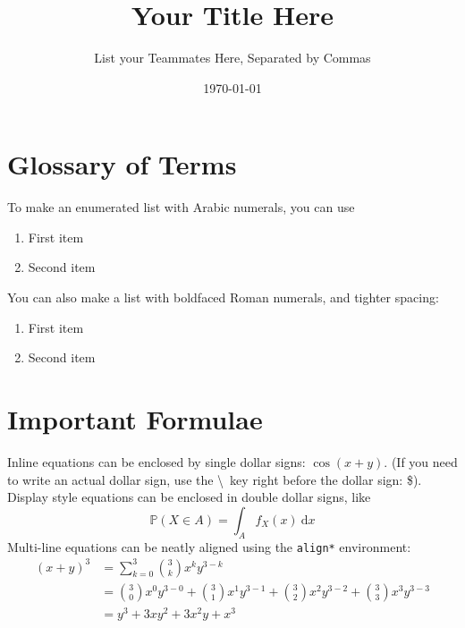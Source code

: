 \documentclass[11pt]{article}
\title{Your Title Here}
\author{List your Teammates Here, Separated by Commas}
\date{\today}
\newcommand{\Prob}{\mathds{P}}      %
\newcommand{\1}{\mathds{1}}         %
\begin{document}
\maketitle



\section{Glossary of Terms}

To make an enumerated list with Arabic numerals, you can use

\begin{enumerate}[label = (\arabic*)]

    \item First item
    \item Second item
    
\end{enumerate}

You can also make a list with boldfaced Roman numerals, and tighter spacing:

\begin{enumerate}[label = \textbf{(\roman*)}, itemsep = 0mm]

    \item First item
    \item Second item
    
\end{enumerate}



\section{Important Formulae}

Inline equations can be enclosed by single dollar signs: $\cos(x + y)$. (If you need to write an actual dollar sign, use the \textbackslash \  key right before the dollar sign: \$). Display style equations can be enclosed in double dollar signs, like
$$ \Prob(X \in A) = \int_{A} f_X(x) \ \mathrm{d}x  $$
Multi-line equations can be neatly aligned using the \verb|align*| environment:
\begin{align*}
    (x + y)^3   & = \sum_{k=0}^{3} \binom{3}{k} x^k y^{3 - k}   \\
                & = \binom{3}{0} x^0 y^{3 - 0} + \binom{3}{1} x^1 y^{3 - 1} + \binom{3}{2} x^2 y^{3 - 2} + \binom{3}{3} x^3 y^{3 - 3}  \\
                & = y^3 + 3 x y^2 + 3 x^2 y + x^3  
\end{align*}
\end{document}
